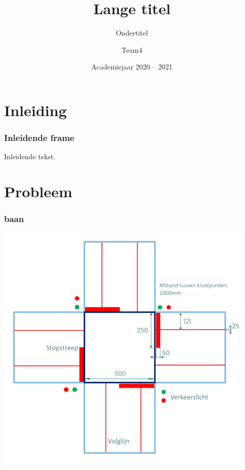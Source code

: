 \documentclass[aspectratio=169,kulak,t]{kulakbeamer} %
\title[Korte titel]{Lange titel}
\subtitle{Ondertitel}
\author[Team4]{Team4}
\institute[Kulak]{KU Leuven Kulak}
\date{Academiejaar 2020 -- 2021}
\begin{document}
\begin{titleframe}
\titlepage
\end{titleframe}

\begin{outlineframe}[Inhoudsopgave]
\tableofcontents
\end{outlineframe}


\section{Inleiding}

\begin{frame}
\frametitle{Inleidende frame}
Inleidende tekst.
\end{frame}

\section{Probleem}

\begin{frame}
	\frametitle{baan}
	\begin{minipage}{0.48\linewidth}
	
		\includegraphics[width = 0.9 \textwidth]{bovenaanzichtkruispunt}
		\cite{kruispunt}
		
	\end{minipage}\hfill
\end{frame}
\end{document}
